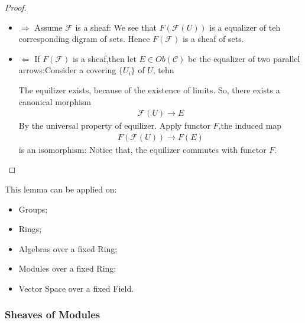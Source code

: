 \documentclass[Total.tex]{subfiles}
\begin{document}
				\begin{proof}
					\begin{itemize}
						\item $\Rightarrow$ Assume $\mathcal{F}$ is a sheaf: We see that $F(\mathcal{F}(U))$ is a equalizer of teh corresponding digram of sets. Hence $F(\mathcal{F})$ is a sheaf of sets.
						\item $\Leftarrow$ If $F(\mathcal{F})$ is a sheaf,then let $E\in Ob(\mathcal{C})$ be the equalizer of two parallel arrows:Consider a covering $\{U_i\}$ of $U$, tehn
						\begin{center}
						\end{center}
						The equilizer exists, because of the existence of limits. So, there exists a canonical morphism
						\begin{gather*}
							\mathcal{F}(U)\rightarrow E
						\end{gather*}
						By the universal property of equilizer. Apply functor $F$,the induced map
						\begin{gather*}
							F(\mathcal{F}(U))\rightarrow F(E)
						\end{gather*}
						is an isomorphism: Notice that, the equilizer commutes with functor $F$. 
					\end{itemize}
				\end{proof}
				
				This lemma can be applied on:
				
				\begin{itemize}
					\item Groups;
					\item Rings;
					\item Algebras over a fixed Ring;
					\item Modules over a fixed Ring;
					\item Vector Space over a fixed Field.
				\end{itemize}
				
				\subsubsection{Sheaves of Modules}
				
\end{document}
